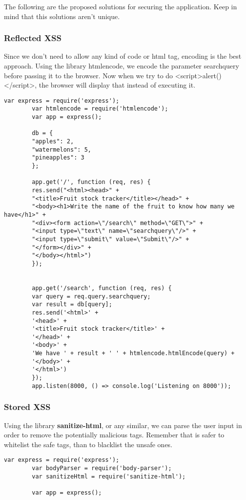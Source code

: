\begin{Answer}[ref={websec-xss-prevention}]
	The following are the proposed solutions for securing the application. Keep in mind that this solutions aren't unique.
	
	\subsubsection{Reflected XSS}
	Since we don't need to allow any kind of code or html tag, encoding is the best approach. Using the library htmlencode, we encode the parameter searchquery before passing it to the browser. Now when we try to do <script>alert()</script>, the browser will display that instead of executing it.
		\begin{lstlisting}[style=JavaScript]
		var express = require('express');
		var htmlencode = require('htmlencode');
		var app = express();
		
		db = {
		"apples": 2,
		"watermelons": 5,
		"pineapples": 3
		};
		
		app.get('/', function (req, res) {
		res.send("<html><head>" +
		"<title>Fruit stock tracker</title></head>" +
		"<body><h1>Write the name of the fruit to know how many we have</h1>" +
		"<div><form action=\"/search\" method=\"GET\">" +
		"<input type=\"text\" name=\"searchquery\"/>" +
		"<input type=\"submit\" value=\"Submit\"/>" +
		"</form></div>" +
		"</body></html>")
		});
		
		
		app.get('/search', function (req, res) {
		var query = req.query.searchquery;
		var result = db[query];
		res.send('<html>' +
		'<head>' +
		'<title>Fruit stock tracker</title>' +
		'</head>' +
		'<body>' +
		'We have ' + result + ' ' + htmlencode.htmlEncode(query) +
		'</body>' +
		'</html>')
		});
		app.listen(8000, () => console.log('Listening on 8000'));
		\end{lstlisting}
	\subsubsection{Stored XSS}
		Using the library \textbf{sanitize-html}, or any similar, we can parse the user input in order to remove the potentially malicious tags. Remember that is safer to whitelist the safe tags, than to blacklist the unsafe ones.
		\begin{lstlisting}[style=JavaScript]
		var express = require('express');
		var bodyParser = require('body-parser');
		var sanitizeHtml = require('sanitize-html');
		
		var app = express();
		

\end{lstlisting}
\end{Answer}
